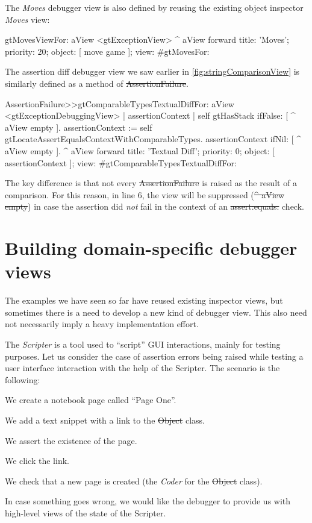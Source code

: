 \documentclass[sigplan,anonymous,review,10pt]{acmart}
\newcommand{\GT}{\lst{GT}\xspace} %
\begin{document}
The \emph{Moves} debugger view is also defined by reusing the existing object inspector \emph{Moves} view:
\begin{code}
gtMovesViewFor: aView
	<gtExceptionView>
	^ aView forward
		title: 'Moves';
		priority: 20;
		object: [ move game ];
		view: #gtMovesFor:
\end{code}

The assertion diff debugger view we saw earlier in \autoref{fig:stringComparisonView} is similarly defined as a method of \st{AssertionFailure}.
\begin{code}
AssertionFailure>>gtComparableTypesTextualDiffFor: aView
	<gtExceptionDebuggingView>
	| assertionContext |
	self gtHasStack ifFalse: [ ^ aView empty ].
	assertionContext := self gtLocateAssertEqualsContextWithComparableTypes.
	assertionContext ifNil: [ ^ aView empty ].
	^ aView forward
		title: 'Textual Diff';
		priority: 0;
		object: [ assertionContext ];
		view: #gtComparableTypesTextualDiffFor: 
\end{code}
The key difference is that not every \st{AssertionFailure} is raised as the result of a comparison.
For this reason, in line $6$, the view will be suppressed (\st{^ aView empty}) in case the assertion did \emph{not} fail in the context of an \st{assert:equals:} check.

\section{Building domain-specific debugger views}\label{sec:interactions}

The examples we have seen so far have reused existing inspector views, but sometimes there is a need to develop a new kind of debugger view.
This also need not necessarily imply a heavy implementation effort.

The \GT \emph{Scripter} is a tool used to ``script'' GUI interactions, mainly for testing purposes.
Let us consider the case of assertion errors being raised while testing a user interface interaction with the help of the Scripter.
The scenario is the following:
\begin{inparaenum}[(i)]
	\item We create a notebook page called ``Page One''.
	\item We add a text snippet with a link to the \st{Object} class.
	\item We assert the existence of the page. 
	\item We click the link.
	\item We check that a new page is created (\ie the \emph{Coder} for the \st{Object} class).
\end{inparaenum}
In case something goes wrong, we would like the debugger to provide us with high-level views of the state of the Scripter.
\end{document}
